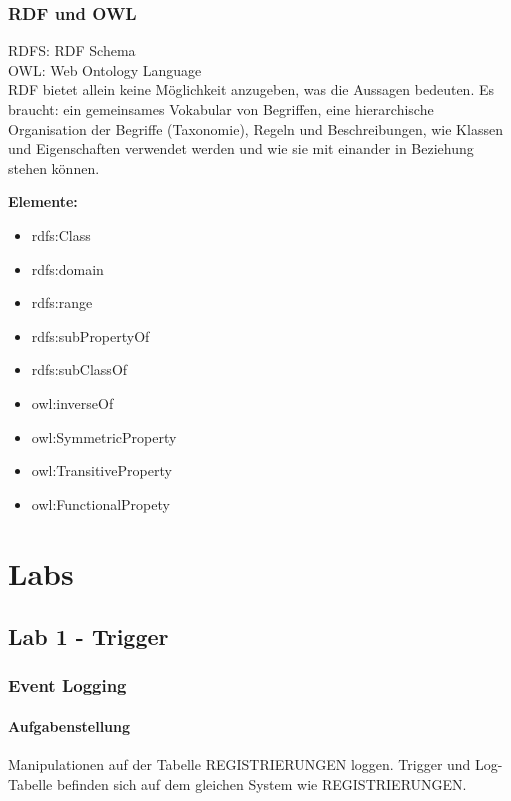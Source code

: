 \documentclass[a4paper,10pt,titlepage=false]{scrreprt}
\begin{document}
\begin{itemize}
\section{RDF und OWL} %
\label{sec:rdf_und_owl}
RDFS: RDF Schema\\
OWL: Web Ontology Language\\
RDF bietet allein keine Möglichkeit anzugeben, was
die Aussagen bedeuten.
Es braucht:
ein gemeinsames Vokabular von Begriffen,
eine hierarchische Organisation der Begriffe
(Taxonomie),
Regeln und Beschreibungen, wie Klassen und
Eigenschaften verwendet werden und wie sie mit
einander in Beziehung stehen können.

\textbf{Elemente:}

\begin{itemize}
  \item rdfs:Class
\item rdfs:domain
\item rdfs:range
\item rdfs:subPropertyOf
\item rdfs:subClassOf
\item owl:inverseOf
\item owl:SymmetricProperty
\item owl:TransitiveProperty
\item owl:FunctionalPropety

\end{itemize}

\part{Labs} %
\label{prt:labs_}
\chapter{Lab 1 - Trigger}
\section{Event Logging}
\subsection{Aufgabenstellung}
Manipulationen auf der Tabelle REGISTRIERUNGEN loggen. Trigger und Log-Tabelle befinden sich auf dem gleichen System wie REGISTRIERUNGEN.\\

\end{itemize}
\end{document}
